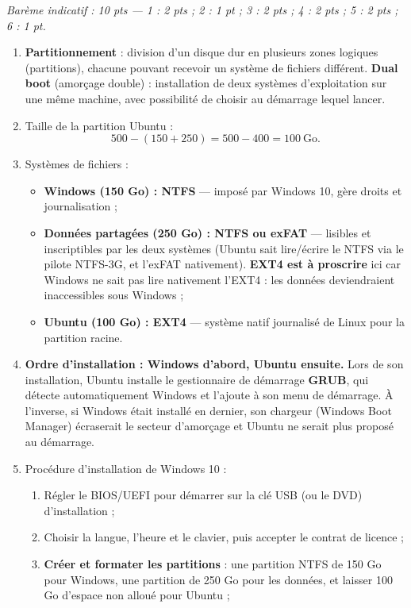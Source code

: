 \documentclass[11pt]{article}
\begin{document}
\begin{corrige}
\emph{Barème indicatif : 10 pts — 1 : 2 pts ; 2 : 1 pt ; 3 : 2 pts ; 4 : 2 pts ; 5 : 2 pts ; 6 : 1 pt.}
\begin{enumerate}
  \item \textbf{Partitionnement} : division d'un disque dur en plusieurs zones logiques (partitions), chacune pouvant recevoir un système de fichiers différent. \textbf{Dual boot} (amorçage double) : installation de deux systèmes d'exploitation sur une même machine, avec possibilité de choisir au démarrage lequel lancer.
  \item Taille de la partition Ubuntu :
  \[ 500 - (150 + 250) = 500 - 400 = 100\ \text{Go}. \]
  \item Systèmes de fichiers :
  \begin{itemize}
    \item \textbf{Windows (150 Go) : NTFS} — imposé par Windows 10, gère droits et journalisation ;
    \item \textbf{Données partagées (250 Go) : NTFS ou exFAT} — lisibles et inscriptibles par les deux systèmes (Ubuntu sait lire/écrire le NTFS via le pilote NTFS-3G, et l'exFAT nativement). \textbf{EXT4 est à proscrire} ici car Windows ne sait pas lire nativement l'EXT4 : les données deviendraient inaccessibles sous Windows ;
    \item \textbf{Ubuntu (100 Go) : EXT4} — système natif journalisé de Linux pour la partition racine.
  \end{itemize}
  \item \textbf{Ordre d'installation : Windows d'abord, Ubuntu ensuite.} Lors de son installation, Ubuntu installe le gestionnaire de démarrage \textbf{GRUB}, qui détecte automatiquement Windows et l'ajoute à son menu de démarrage. À l'inverse, si Windows était installé en dernier, son chargeur (Windows Boot Manager) écraserait le secteur d'amorçage et Ubuntu ne serait plus proposé au démarrage.
  \item Procédure d'installation de Windows 10 :
  \begin{enumerate}
    \item Régler le BIOS/UEFI pour démarrer sur la clé USB (ou le DVD) d'installation ;
    \item Choisir la langue, l'heure et le clavier, puis accepter le contrat de licence ;
    \item \textbf{Créer et formater les partitions} : une partition NTFS de 150 Go pour Windows, une partition de 250 Go pour les données, et laisser 100 Go d'espace non alloué pour Ubuntu ;

\end{enumerate}
\end{enumerate}
\end{corrige}
\end{document}
